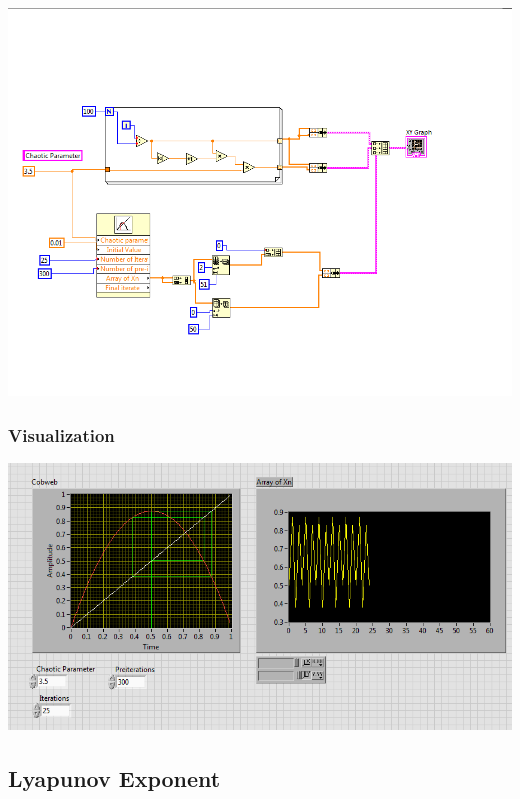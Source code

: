 \documentclass[9pt]{beamer}
\begin{document}
\begin{frame}
	\begin{center}
		\includegraphics[scale=0.4]{images/cobweb_block}
	\end{center}
\end{frame}

\begin{frame}

	\frametitle{Visualization}

	\begin{center}
		\includegraphics[scale=0.4]{images/cobweb_r_3.5_good.PNG}
	\end{center}
\end{frame}


\subsection{Lyapunov Exponent}
\end{document}
